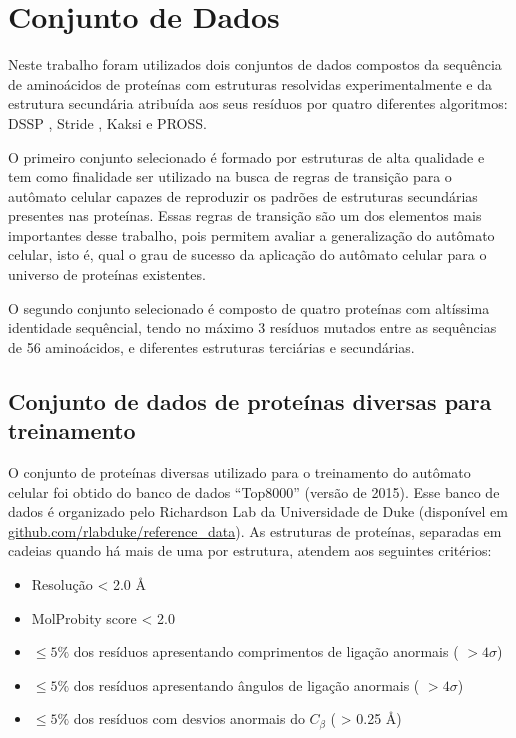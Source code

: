 \chapter{Conjunto de Dados}

Neste trabalho foram utilizados dois conjuntos de dados compostos da sequência de aminoácidos de proteínas com estruturas resolvidas experimentalmente e da estrutura secundária atribuída aos seus resíduos por quatro diferentes algoritmos: DSSP \cite{Kabsch:1978}, Stride \cite{Frishman:1990}, Kaksi \cite{Martin:2000} e PROSS\cite{Srinivasan:1994}.

O primeiro conjunto selecionado é formado por  estruturas de alta qualidade e tem como finalidade ser utilizado na busca de regras de transição para o autômato celular capazes de reproduzir os padrões de estruturas secundárias presentes nas proteínas. Essas regras de transição são um dos elementos mais importantes desse trabalho, pois permitem avaliar a generalização do autômato celular, isto é, qual o grau de sucesso da aplicação do autômato celular para o universo de proteínas existentes.

O segundo conjunto selecionado é composto de quatro proteínas com altíssima identidade sequêncial, tendo no máximo 3 resíduos mutados entre as sequências de 56 aminoácidos, e diferentes estruturas terciárias e secundárias. 


\section{Conjunto de dados de proteínas diversas para treinamento}

O conjunto de proteínas diversas utilizado para o treinamento do autômato celular foi obtido do banco de dados “Top8000” (versão de 2015). Esse banco de dados é organizado pelo Richardson Lab da Universidade de Duke (disponível em \href{https://github.com/rlabduke/reference_data}{github.com/rlabduke/reference\_data}). As estruturas de proteínas, separadas em cadeias quando há mais de uma por estrutura, atendem aos seguintes critérios:

\begin{itemize}
	\item{Resolução < 2.0 \AA}
	\item{MolProbity score < 2.0}
	\item{$\le 5 \%$ dos resíduos apresentando comprimentos de ligação anormais ( $> 4\sigma$)}
	\item{$\le 5 \%$ dos resíduos apresentando ângulos de ligação anormais ( $> 4\sigma$)}
	\item{$\le 5 \%$ dos resíduos com desvios anormais do  $C_\beta$ ( > 0.25 \AA)}
\end{itemize}

